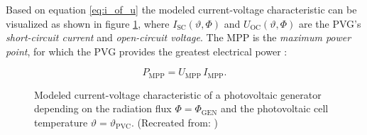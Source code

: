 Based on equation \ref{eq:i_of_u} the modeled current-voltage characteristic can be visualized as shown in figure \ref{fig:tikz/tikz_PVG_curve}, where $I_{\mathrm{SC}}\left(\vartheta,\Phi\right)$ and $U_{\mathrm{OC}}\left(\vartheta,\Phi\right)$ are the PVG's \emph{short-circuit current} and \emph{open-circuit voltage}. The MPP is the \emph{maximum power point}, for which the PVG provides the greatest electrical power \cite{Prechtl:2006, Mertens:2015, Wagner:2018}:
\begin{center}
	\begin{equation} \label{eq:p_mpp}
		P_{\mathrm{MPP}} = U_{\mathrm{MPP}} \, I_{\mathrm{MPP}} \text{.}
	\end{equation}
\end{center}
\begin{figure}[h!]
	\centering
	
	\caption{Modeled current-voltage characteristic of a photovoltaic generator depending on the radiation flux $\Phi = \Phi_{\mathrm{GEN}}$ and the photovoltaic cell temperature $\vartheta = \vartheta_{\mathrm{PVC}}$. (Recreated from: \cite{Mertens:2015, Wagner:2018})}
	\label{fig:tikz/tikz_PVG_curve}
\end{figure}


